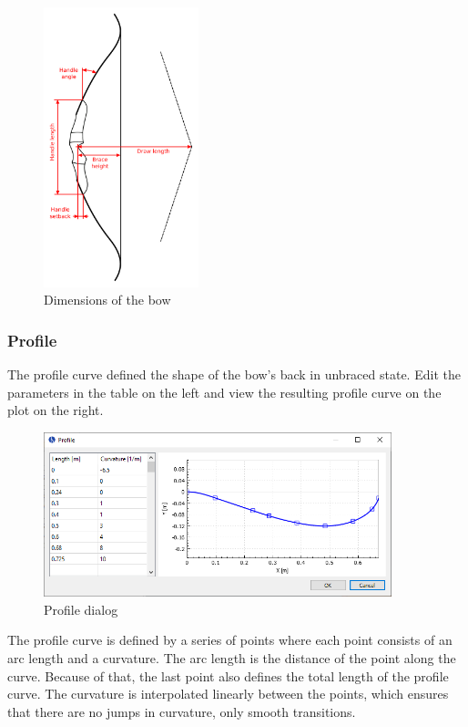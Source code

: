 \documentclass[12pt]{article}
\begin{document}
\begin{figure}[H]
\centering
\includegraphics[width=0.4\textwidth]{figures/dimensions}
\caption{Dimensions of the bow}
\label{fig:dimensions-2}
\end{figure}

\newpage
\subsubsection{Profile}

The profile curve defined the shape of the bow's back in unbraced state.
Edit the parameters in the table on the left and view the resulting profile curve on the plot on the right.

\bigskip

\begin{figure}[H]
\centering
\includegraphics[width=0.9\textwidth]{figures/screenshots/input/profile}
\caption{Profile dialog}
\label{fig:profile}
\end{figure}

The profile curve is defined by a series of points where each point consists of an arc length and a curvature.
The arc length is the distance of the point along the curve.
Because of that, the last point also defines the total length of the profile curve.
The curvature is interpolated linearly between the points, which ensures that there are no jumps in curvature, only smooth transitions.
\end{document}
